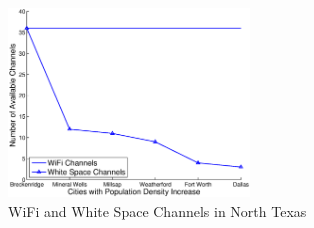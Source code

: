 \begin{figure}
\vspace{-0.0in}
\centering
\includegraphics[width=64mm]{figures/wschannels}
\vspace{-0.1in}
\caption{WiFi and White Space Channels in North Texas}
\label{fig:wschannels}
\vspace{-0.3in}
\end{figure}



 







